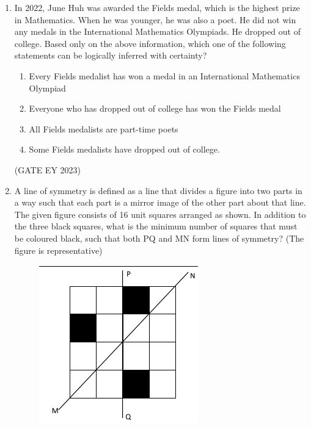 \documentclass[journal,12pt,onecolumn]{IEEEtran}
\theoremstyle{remark}
\begin{document}
\begin{enumerate}
\begin{enumerate}
\begin{multicols}{4}
\end{multicols}
\end{enumerate}
\hfill{(GATE EY 2023)}

 \item In 2022, June Huh was awarded the Fields medal, which is the highest prize in
Mathematics.
When he was younger, he was also a poet. He did not win any medals in the
International Mathematics Olympiads. He dropped out of college.
Based only on the above information, which one of the following statements can be
logically inferred with certainty?

\begin{enumerate}

\item Every Fields medalist has won a medal in an International Mathematics Olympiad
\item Everyone who has dropped out of college has won the Fields medal
\item All Fields medalists are part-time poets
\item Some Fields medalists have dropped out of college.


\end{enumerate}
\hfill{(GATE EY 2023)}

 \item A line of symmetry is defined as a line that divides a figure into two parts in a way
such that each part is a mirror image of the other part about that line.
The given figure consists of 16 unit squares arranged as shown. In addition to the
three black squares, what is the minimum number of squares that must be coloured
black, such that both PQ and MN form lines of symmetry? (The figure is
representative)

\begin{figure}[H]
    \centering
    \includegraphics[]{figs/Q.5.png}
    \caption{}
    \label{fig:2}
\end{figure}
 

\end{enumerate}
\end{document}
